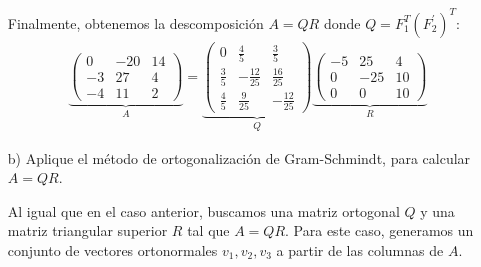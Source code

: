 \begin{homeworkProblem}
\begin{itemize}
\begin{solucion}
    Finalmente, obtenemos la descomposición \( A = QR \) donde $Q=F_1^T(F_2^{'})^T$:
    \begin{align*}
        \underbrace{
        \begin{pmatrix}
            0 & -20 & 14\\
            -3 & 27 & 4\\
            -4 & 11 & 2
        \end{pmatrix}
        }_{A}
        =
        \underbrace{
        \begin{pmatrix}
            0 & \frac{4}{5} & \frac{3}{5} \\
            \frac{3}{5} & -\frac{12}{25} & \frac{16}{25} \\
            \frac{4}{5} & \frac{9}{25} & -\frac{12}{25}
        \end{pmatrix}
        }_{Q}
        \underbrace{
        \begin{pmatrix}
            -5 & 25 & 4 \\
            0 & -25 & 10 \\
            0 & 0 & 10
        \end{pmatrix}
        }_{R}
    \end{align*}
        \end{solucion}
        \item[b)] Aplique el método de ortogonalización de Gram-Schmindt, para calcular $A=QR$.
        \begin{solucion}
          Al igual que en el caso anterior, buscamos una matriz ortogonal $Q$ y una matriz triangular superior $R$ tal que $A = QR$. Para este caso, generamos un conjunto de vectores ortonormales $v_1, v_2, v_3$ a partir de las columnas de $A$.  


\end{solucion}
\end{itemize}
\end{homeworkProblem}
